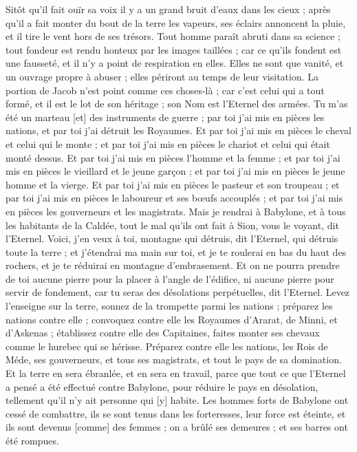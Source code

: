 \begin{multicols}{2}
Sitôt qu'il fait ouïr sa voix il y a un grand bruit d'eaux dans les cieux ; après qu'il a fait monter du bout de la terre les vapeurs, ses éclairs annoncent la pluie, et il tire le vent hors de ses trésors.
Tout homme paraît abruti dans sa science ; tout fondeur est rendu honteux par les images taillées ; car ce qu'ils fondent est une fausseté, et il n'y a point de respiration en elles.
Elles ne sont que vanité, et un ouvrage propre à abuser ; elles périront au temps de leur visitation.
La portion de Jacob n'est point comme ces choses-là ; car c'est celui qui a tout formé, et il est le lot de son héritage ; son Nom est l'Eternel des armées.
Tu m'as été un marteau [et] des instruments de guerre ; par toi j'ai mis en pièces les nations, et par toi j'ai détruit les Royaumes.
Et par toi j'ai mis en pièces le cheval et celui qui le monte ; et par toi j'ai mis en pièces le chariot et celui qui était monté dessus.
Et par toi j'ai mis en pièces l'homme et la femme ; et par toi j'ai mis en pièces le vieillard et le jeune garçon ; et par toi j'ai mis en pièces le jeune homme et la vierge.
Et par toi j'ai mis en pièces le pasteur et son troupeau ; et par toi j'ai mis en pièces le laboureur et ses bœufs accouplés ; et par toi j'ai mis en pièces les gouverneurs et les magistrats.
Mais je rendrai à Babylone, et à tous les habitants de la Caldée, tout le mal qu'ils ont fait à Sion, vous le voyant, dit l'Eternel.
Voici, j'en veux à toi, montagne qui détruis, dit l'Eternel, qui détruis toute la terre ; et j'étendrai ma main sur toi, et je te roulerai en bas du haut des rochers, et je te réduirai en montagne d'embrasement.
Et on ne pourra prendre de toi aucune pierre pour la placer à l'angle de l'édifice, ni aucune pierre pour servir de fondement, car tu seras des désolations perpétuelles, dit l'Eternel.
Levez l'enseigne sur la terre, sonnez de la trompette parmi les nations ; préparez les nations contre elle ; convoquez contre elle les Royaumes d'Ararat, de Minni, et d'Askenas ; établissez contre elle des Capitaines, faites monter ses chevaux comme le hurebec qui se hérisse.
Préparez contre elle les nations, les Rois de Méde, ses gouverneurs, et tous ses magistrats, et tout le pays de sa domination.
Et la terre en sera ébranlée, et en sera en travail, parce que tout ce que l'Eternel a pensé a été effectué contre Babylone, pour réduire le pays en désolation, tellement qu'il n'y ait personne qui [y] habite.
Les hommes forts de Babylone ont cessé de combattre, ils se sont tenus dans les forteresses, leur force est éteinte, et ils sont devenus [comme] des femmes ; on a brûlé ses demeures ; et ses barres ont été rompues.

\end{multicols}
